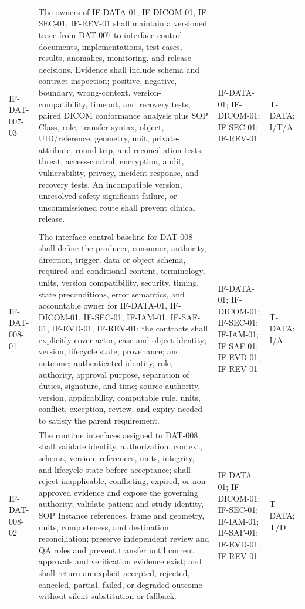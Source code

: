 \documentclass[11pt,letterpaper]{article}
\begin{document}
\begin{scriptsize}
\begin{longtable}{@{}L{0.14\textwidth}L{0.49\textwidth}L{0.19\textwidth}L{0.10\textwidth}@{}}
\addlinespace[2pt]
\mbox{IF-DAT-007-03} & The owners of IF-DATA-01, IF-DICOM-01, IF-SEC-01, IF-REV-01 shall maintain a versioned trace from DAT-007 to interface-control documents, implementations, test cases, results, anomalies, monitoring, and release decisions. Evidence shall include schema and contract inspection; positive, negative, boundary, wrong-context, version-compatibility, timeout, and recovery tests; paired DICOM conformance analysis plus SOP Class, role, transfer syntax, object, UID\slash\allowbreak{}reference, geometry, unit, private-attribute, round-trip, and reconciliation tests; threat, access-control, encryption, audit, vulnerability, privacy, incident-response, and recovery tests. An incompatible version, unresolved safety-significant failure, or uncommissioned route shall prevent clinical release. & IF-DATA-01; IF-DICOM-01; IF-SEC-01; IF-REV-01 & T-DATA; I\slash\allowbreak{}T\slash\allowbreak{}A \\
\addlinespace[2pt]
 \\
\addlinespace[2pt]
\mbox{IF-DAT-008-01} & The interface-control baseline for DAT-008 shall define the producer, consumer, authority, direction, trigger, data or object schema, required and conditional content, terminology, units, version compatibility, security, timing, state preconditions, error semantics, and accountable owner for IF-DATA-01, IF-DICOM-01, IF-SEC-01, IF-IAM-01, IF-SAF-01, IF-EVD-01, IF-REV-01; the contracts shall explicitly cover actor, case and object identity; version; lifecycle state; provenance; and outcome; authenticated identity, role, authority, approval purpose, separation of duties, signature, and time; source authority, version, applicability, computable rule, units, conflict, exception, review, and expiry needed to satisfy the parent requirement. & IF-DATA-01; IF-DICOM-01; IF-SEC-01; IF-IAM-01; IF-SAF-01; IF-EVD-01; IF-REV-01 & T-DATA; I\slash\allowbreak{}A \\
\addlinespace[2pt]
\mbox{IF-DAT-008-02} & The runtime interfaces assigned to DAT-008 shall validate identity, authorization, context, schema, version, references, units, integrity, and lifecycle state before acceptance; shall reject inapplicable, conflicting, expired, or non-approved evidence and expose the governing authority; validate patient and study identity, SOP Instance references, frame and geometry, units, completeness, and destination reconciliation; preserve independent review and QA roles and prevent transfer until current approvals and verification evidence exist; and shall return an explicit accepted, rejected, canceled, partial, failed, or degraded outcome without silent substitution or fallback. & IF-DATA-01; IF-DICOM-01; IF-SEC-01; IF-IAM-01; IF-SAF-01; IF-EVD-01; IF-REV-01 & T-DATA; T\slash\allowbreak{}D \\

\end{longtable}
\end{scriptsize}
\end{document}
